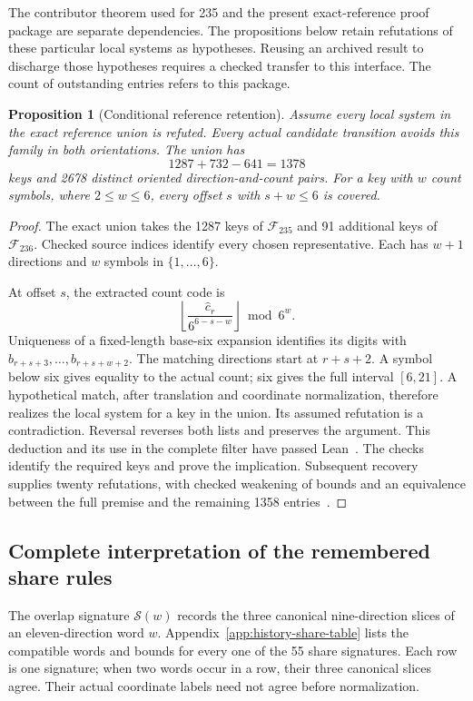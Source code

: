 \documentclass[11pt,a4paper]{article}
\newtheorem{proposition}[theorem]{Proposition}
\theoremstyle{definition}
\theoremstyle{remark}
\begin{document}
The contributor theorem used for 235 and the present exact-reference proof
package are separate dependencies. The propositions below retain
refutations of these particular local systems as hypotheses. Reusing an
archived result to discharge those hypotheses requires a checked transfer
to this interface. The count of outstanding entries refers to this package.

\begin{proposition}[Conditional reference retention]\label{prop:reference-union-retention}
Assume every local system in the exact reference union is refuted. Every
actual candidate transition avoids this family in both orientations. The union has
\[
1287+732-641=1378
\]
keys and 2678 distinct oriented direction-and-count pairs. For a key with
$w$ count symbols, where $2\le w\le6$, every offset $s$ with $s+w\le6$
is covered.
\end{proposition}
\begin{proof}
The exact union takes the 1287 keys of $\mathcal F_{235}$ and 91 additional
keys of $\mathcal F_{236}$. Checked source indices identify every chosen
representative. Each has $w+1$ directions and $w$ symbols in $\{1,\ldots,6\}$.

At offset $s$, the extracted count code is
\[
\left\lfloor\frac{\widehat c_r}{6^{6-s-w}}\right\rfloor\bmod6^w.
\]
Uniqueness of a fixed-length base-six expansion identifies its digits with
$b_{r+s+3},\ldots,b_{r+s+w+2}$. The matching directions start at $r+s+2$.
A symbol below six gives equality to the actual count; six gives the full
interval $[6,21]$. A hypothetical match, after translation and coordinate
normalization, therefore realizes the local system for a key in the union.
Its assumed refutation is a contradiction. Reversal reverses both lists and
preserves the argument. This deduction and its use in the complete filter
have passed Lean~\cite{referenceunionarchive}. The checks identify the required
keys and prove the implication. Subsequent recovery supplies twenty
refutations, with checked weakening of bounds and an equivalence between
the full premise and the remaining 1358 entries~\cite{recoveryarchive,pair012032archive}.
\end{proof}

\subsection{Complete interpretation of the remembered share rules}\label{sec:history-share-complete}
The overlap signature $\mathcal S(w)$ records the three canonical nine-direction
slices of an eleven-direction word $w$. Appendix~\ref{app:history-share-table}
lists the compatible words and bounds for every one of the 55 share signatures.
Each row is one signature; when two words occur in a row, their three canonical
slices agree. Their actual coordinate labels need not agree before normalization.
\end{document}
